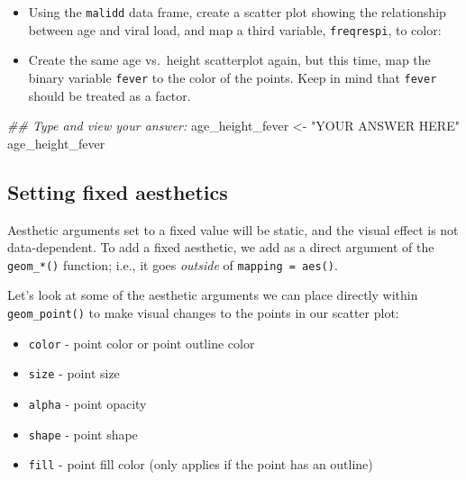 \documentclass[
  letterpaper,
  DIV=11,
  numbers=noendperiod]{scrreprt}
\newenvironment{Shaded}{\begin{snugshade}}{\end{snugshade}}
\newcommand{\DocumentationTok}[1]{\textcolor[rgb]{0.37,0.37,0.37}{\textit{#1}}}
\newcommand{\NormalTok}[1]{\textcolor[rgb]{0.00,0.23,0.31}{#1}}
\newcommand{\OtherTok}[1]{\textcolor[rgb]{0.00,0.23,0.31}{#1}}
\newcommand{\StringTok}[1]{\textcolor[rgb]{0.13,0.47,0.30}{#1}}
\begin{document}
\begin{tcolorbox}[enhanced jigsaw, title=\textcolor{quarto-callout-tip-color}{\faLightbulb}\hspace{0.5em}{Practice}, colbacktitle=quarto-callout-tip-color!10!white, leftrule=.75mm, arc=.35mm, opacityback=0, bottomrule=.15mm, rightrule=.15mm, toptitle=1mm, breakable, toprule=.15mm, colback=white, coltitle=black, colframe=quarto-callout-tip-color-frame, bottomtitle=1mm, titlerule=0mm, left=2mm, opacitybacktitle=0.6]

\begin{itemize}
\item
  Using the \texttt{malidd} data frame, create a scatter plot showing
  the relationship between age and viral load, and map a third variable,
  \texttt{freqrespi}, to color:
\item
  Create the same age vs.~height scatterplot again, but this time, map
  the binary variable \texttt{fever} to the color of the points. Keep in
  mind that \texttt{fever} should be treated as a factor.
\end{itemize}

\begin{Shaded}
\begin{Highlighting}[]
\DocumentationTok{\#\# Type and view your answer:}
\NormalTok{age\_height\_fever }\OtherTok{\textless{}{-}}  \StringTok{"YOUR ANSWER HERE"}
\NormalTok{age\_height\_fever}
\end{Highlighting}
\end{Shaded}

\end{tcolorbox}

\subsection{Setting fixed aesthetics}\label{setting-fixed-aesthetics}

Aesthetic arguments set to a fixed value will be static, and the visual
effect is not data-dependent. To add a fixed aesthetic, we add as a
direct argument of the \texttt{geom\_*()} function; i.e., it goes
\emph{outside} of \texttt{mapping\ =\ aes()}.

Let's look at some of the aesthetic arguments we can place directly
within \texttt{geom\_point()} to make visual changes to the points in
our scatter plot:

\begin{itemize}
\item
  \texttt{color} - point color or point outline color
\item
  \texttt{size} - point size
\item
  \texttt{alpha} - point opacity
\item
  \texttt{shape} - point shape
\item
  \texttt{fill} - point fill color (only applies if the point has an
  outline)
\end{itemize}
\end{document}
